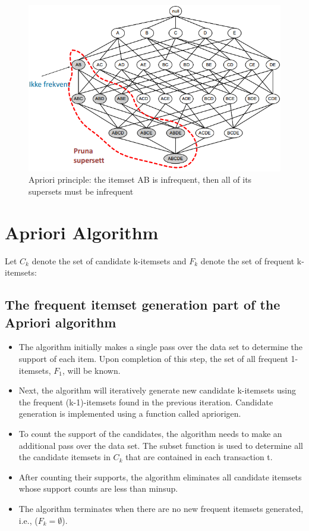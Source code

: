		\begin{figure}[H]
			\centering
			\includegraphics[scale=0.5]{pics/lattice4.png}
			\caption{Apriori principle: the itemset AB is infrequent, then all of its supersets must be infrequent}
		\end{figure}

	\clearpage

	\section{Apriori Algorithm}

		Let $C_{k}$ denote the set of candidate k-itemsets and $F_{k}$ denote the set of frequent 
		k-itemsets:

		\subsection*{The frequent itemset generation part of the Apriori algorithm}
		\begin{itemize}
			\item The algorithm initially makes a single pass over the data set to determine
			the support of each item. Upon completion of this step, the set of all frequent
			1-itemsets, $F_{1}$, will be known.
			\item Next, the algorithm will iteratively generate new candidate k-itemsets
			using the frequent (k-1)-itemsets found in the previous iteration. Candidate
			generation is implemented using a function called apriorigen.
			\item To count the support of the candidates, the algorithm needs to make 
			an additional pass over the data set. The subset function is used to determine
			all the candidate itemsets in $C_{k}$ that are contained in each transaction t.
			\item After counting their supports, the algorithm eliminates all candidate
			itemsets whose support counts are less than minsup.
			\item The algorithm terminates when there are no new frequent itemsets generated,
			i.e., ($F_{k} = \emptyset$).
		\end{itemize}

